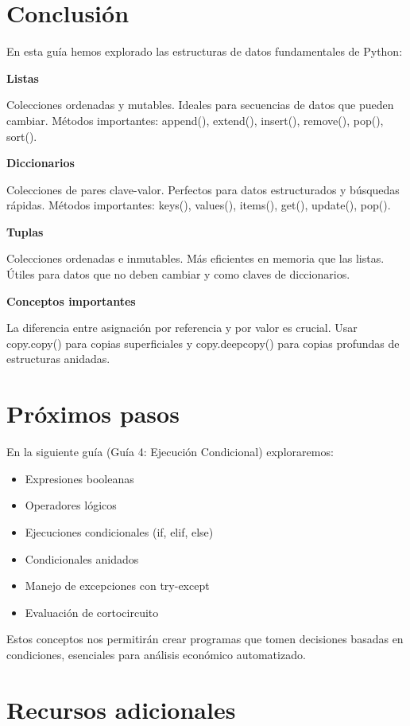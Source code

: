 \documentclass[
  doc,
  floatsintext,
  longtable,
  a4paper,
  nolmodern,
  notxfonts,
  notimes,
  12pt,
  colorlinks=true,linkcolor=blue,citecolor=blue,urlcolor=blue]{apa7}
\providecommand{\tightlist}{%
  \setlength{\itemsep}{0pt}\setlength{\parskip}{0pt}}
\begin{document}
\section{Conclusión}\label{conclusiuxf3n}

En esta guía hemos explorado las estructuras de datos fundamentales de
Python:

\textbf{Listas}

Colecciones ordenadas y mutables. Ideales para secuencias de datos que
pueden cambiar. Métodos importantes: append(), extend(), insert(),
remove(), pop(), sort().

\textbf{Diccionarios}

Colecciones de pares clave-valor. Perfectos para datos estructurados y
búsquedas rápidas. Métodos importantes: keys(), values(), items(),
get(), update(), pop().

\textbf{Tuplas}

Colecciones ordenadas e inmutables. Más eficientes en memoria que las
listas. Útiles para datos que no deben cambiar y como claves de
diccionarios.

\textbf{Conceptos importantes}

La diferencia entre asignación por referencia y por valor es crucial.
Usar copy.copy() para copias superficiales y copy.deepcopy() para copias
profundas de estructuras anidadas.

\section{Próximos pasos}\label{pruxf3ximos-pasos}

En la siguiente guía (Guía 4: Ejecución Condicional) exploraremos:

\begin{itemize}
\tightlist
\item
  Expresiones booleanas
\item
  Operadores lógicos
\item
  Ejecuciones condicionales (if, elif, else)
\item
  Condicionales anidados
\item
  Manejo de excepciones con try-except
\item
  Evaluación de cortocircuito
\end{itemize}

Estos conceptos nos permitirán crear programas que tomen decisiones
basadas en condiciones, esenciales para análisis económico automatizado.

\section{Recursos adicionales}\label{recursos-adicionales}
\end{document}

